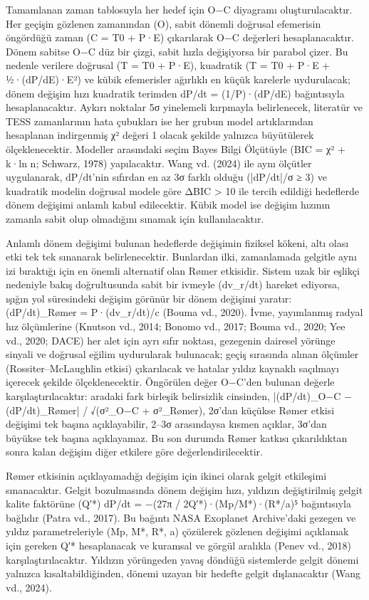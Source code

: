 Tamamlanan zaman tablosuyla her hedef için O−C diyagramı oluşturulacaktır. Her geçişin gözlenen zamanından (O), sabit dönemli doğrusal efemerisin öngördüğü zaman (C = T0 + P·E) çıkarılarak O−C değerleri hesaplanacaktır. Dönem sabitse O−C düz bir çizgi, sabit hızla değişiyorsa bir parabol çizer. Bu nedenle verilere doğrusal (T = T0 + P·E), kuadratik (T = T0 + P·E + ½·(dP/dE)·E²) ve kübik efemerisler ağırlıklı en küçük karelerle uydurulacak; dönem değişim hızı kuadratik terimden dP/dt = (1/P)·(dP/dE) bağıntısıyla hesaplanacaktır. Aykırı noktalar 5σ yinelemeli kırpmayla belirlenecek, literatür ve TESS zamanlarının hata çubukları ise her grubun model artıklarından hesaplanan indirgenmiş χ² değeri 1 olacak şekilde yalnızca büyütülerek ölçeklenecektir. Modeller arasındaki seçim Bayes Bilgi Ölçütüyle (BIC = χ² + k·ln n; Schwarz, 1978) yapılacaktır. Wang vd. (2024) ile aynı ölçütler uygulanarak, dP/dt'nin sıfırdan en az 3σ farklı olduğu (|dP/dt|/σ ≥ 3) ve kuadratik modelin doğrusal modele göre ΔBIC > 10 ile tercih edildiği hedeflerde dönem değişimi anlamlı kabul edilecektir. Kübik model ise değişim hızının zamanla sabit olup olmadığını sınamak için kullanılacaktır.

Anlamlı dönem değişimi bulunan hedeflerde değişimin fiziksel kökeni, altı olası etki tek tek sınanarak belirlenecektir. Bunlardan ilki, zamanlamada gelgitle aynı izi bıraktığı için en önemli alternatif olan Rømer etkisidir. Sistem uzak bir eşlikçi nedeniyle bakış doğrultusunda sabit bir ivmeyle (dv\_r/dt) hareket ediyorsa, ışığın yol süresindeki değişim görünür bir dönem değişimi yaratır: (dP/dt)\_Rømer = P·(dv\_r/dt)/c (Bouma vd., 2020). İvme, yayımlanmış radyal hız ölçümlerine (Knutson vd., 2014; Bonomo vd., 2017; Bouma vd., 2020; Yee vd., 2020; DACE) her alet için ayrı sıfır noktası, gezegenin dairesel yörünge sinyali ve doğrusal eğilim uydurularak bulunacak; geçiş sırasında alınan ölçümler (Rossiter–McLaughlin etkisi) çıkarılacak ve hatalar yıldız kaynaklı saçılmayı içerecek şekilde ölçeklenecektir. Öngörülen değer O−C'den bulunan değerle karşılaştırılacaktır: aradaki fark birleşik belirsizlik cinsinden, |(dP/dt)\_O−C − (dP/dt)\_Rømer| / √(σ²\_O−C + σ²\_Rømer), 2σ'dan küçükse Rømer etkisi değişimi tek başına açıklayabilir, 2–3σ arasındaysa kısmen açıklar, 3σ'dan büyükse tek başına açıklayamaz. Bu son durumda Rømer katkısı çıkarıldıktan sonra kalan değişim diğer etkilere göre değerlendirilecektir.

Rømer etkisinin açıklayamadığı değişim için ikinci olarak gelgit etkileşimi sınanacaktır. Gelgit bozulmasında dönem değişim hızı, yıldızın değiştirilmiş gelgit kalite faktörüne (Q′*) dP/dt = −(27π / 2Q′*)·(Mp/M*)·(R*/a)⁵ bağıntısıyla bağlıdır (Patra vd., 2017). Bu bağıntı NASA Exoplanet Archive'daki gezegen ve yıldız parametreleriyle (Mp, M*, R*, a) çözülerek gözlenen değişimi açıklamak için gereken Q′* hesaplanacak ve kuramsal ve görgül aralıkla (Penev vd., 2018) karşılaştırılacaktır. Yıldızın yörüngeden yavaş döndüğü sistemlerde gelgit dönemi yalnızca kısaltabildiğinden, dönemi uzayan bir hedefte gelgit dışlanacaktır (Wang vd., 2024).

